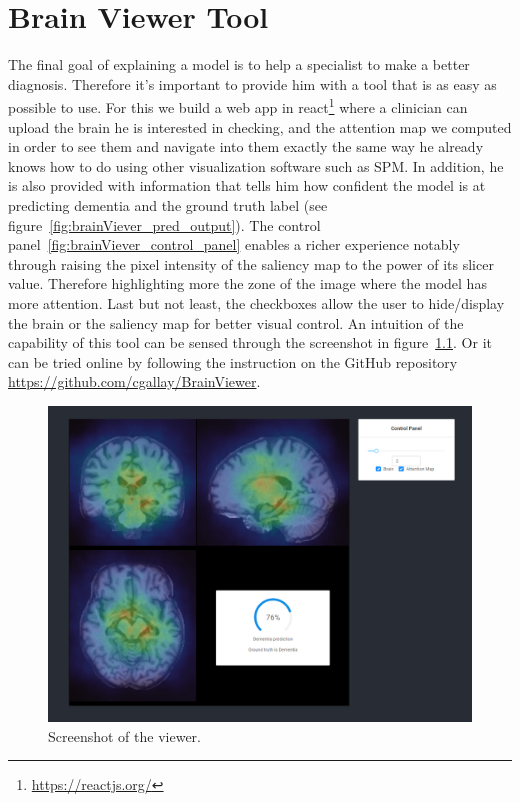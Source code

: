 \chapter{Brain Viewer Tool}
\label{chap:brainviewer}
The final goal of explaining a model is to help a specialist to make a better diagnosis. Therefore it's important to provide him with a tool that is as easy as possible to use. For this we build a web app in react\footnote{\href{https://reactjs.org/}{https://reactjs.org/}} where a clinician can upload the brain he is interested in checking, and the attention map we computed in order to see them and navigate into them exactly the same way he already knows how to do using other visualization software such as SPM\footnotemark{}. In addition, he is also provided with information that tells him how confident the model is at predicting dementia and the ground truth label (see figure~\ref{fig:brainViever_pred_output}). The control panel~\ref{fig:brainViever_control_panel} enables a richer experience notably through raising the pixel intensity of the saliency map to the power of its slicer value. Therefore highlighting more the zone of the image where the model has more attention. Last but not least, the checkboxes allow the user to hide/display the brain or the saliency map for better visual control. An intuition of the capability of this tool can be sensed through the screenshot in figure~\ref{fig:brain_viewer}. Or it can be tried online by following the instruction on the GitHub repository \href{https://github.com/cgallay/BrainViewer}{https://github.com/cgallay/BrainViewer}.

\begin{figure}
 \centering
 \includegraphics[width=.9\linewidth]{figures/BrainViewer/main.png}
 \captionsetup{width=.9\linewidth}
 \caption{Screenshot of the viewer.}
 \label{fig:brain_viewer}
\end{figure}

